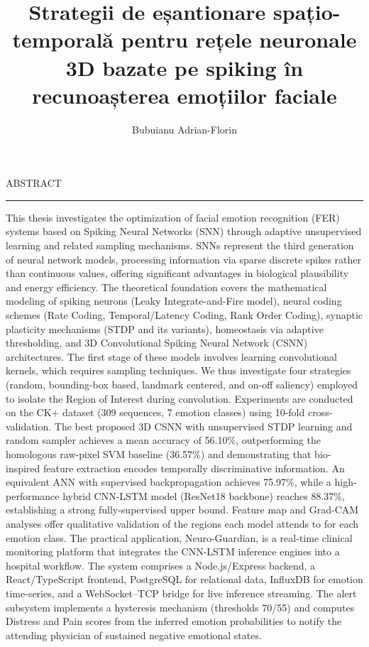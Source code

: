 \documentclass[12pt]{report}
\begin{document}
\title{Strategii de eșantionare spațio-temporală pentru rețele neuronale 3D bazate pe spiking în recunoașterea emoțiilor faciale}					   
\author{Bubuianu Adrian-Florin}											

\maketitle

\newpage
\thispagestyle{empty}
\mbox{}
\newpage
{} 

\cleardoublepage
ABSTRACT
\vspace{0.5cm}	
\hrule
\vspace{0.5cm}	

This thesis investigates the optimization of facial emotion recognition (FER) systems based on Spiking Neural Networks (SNN) through adaptive unsupervised learning and related sampling mechanisms. SNNs represent the third generation of neural network models, processing information via sparse discrete spikes rather than continuous values, offering significant advantages in biological plausibility and energy efficiency.
The theoretical foundation covers the mathematical modeling of spiking neurons (Leaky Integrate-and-Fire model), neural coding schemes (Rate Coding, Temporal/Latency Coding, Rank Order Coding), synaptic plasticity mechanisms (STDP and its variants), homeostasis via adaptive thresholding, and 3D Convolutional Spiking Neural Network (CSNN) architectures. The first stage of these models involves learning convolutional kernels, which requires sampling techniques. We thus investigate four strategies (random, bounding-box based, landmark centered, and on-off saliency) employed to isolate the Region of Interest during convolution.
Experiments are conducted on the CK+ dataset (309 sequences, 7 emotion classes) using 10-fold cross-validation. The best proposed 3D CSNN with unsupervised STDP learning and random sampler achieves a mean accuracy of 56.10\%, outperforming the homologous raw-pixel SVM baseline (36.57\%) and demonstrating that bio-inspired feature extraction encodes temporally discriminative information. An equivalent ANN with supervised backpropagation achieves 75.97\%, while a high-performance hybrid CNN-LSTM model (ResNet18 backbone) reaches 88.37\%, establishing a strong fully-supervised upper bound. Feature map and Grad-CAM analyses offer qualitative validation of the regions each model attends to for each emotion class.
The practical application, Neuro-Guardian, is a real-time clinical monitoring platform that integrates the CNN-LSTM inference engines into a hospital workflow. The system comprises a Node.js/Express backend, a React/TypeScript frontend, PostgreSQL for relational data, InfluxDB for emotion time-series, and a WebSocket–TCP bridge for live inference streaming. The alert subsystem implements a hysteresis mechanism (thresholds 70/55) and computes Distress and Pain scores from the inferred emotion probabilities to notify the attending physician of sustained negative emotional states.
\end{document}
